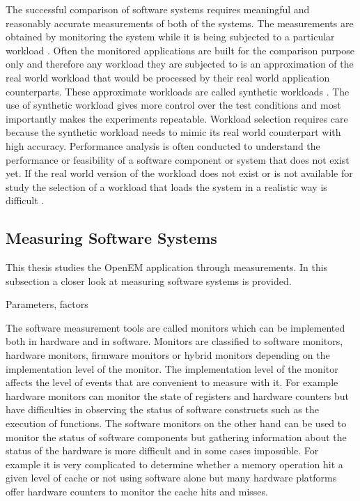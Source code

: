 The successful comparison of software systems requires meaningful and reasonably
accurate measurements of both of the systems. The measurements are obtained by
monitoring the system while it is being subjected to a particular workload
\cite{jain1991art}. Often the monitored applications are built for the
comparison purpose only and therefore any workload they are subjected to is an
approximation of the real world workload that would be processed by their real
world application counterparts. These approximate workloads are called synthetic
workloads \cite{jain1991art}. The use of synthetic workload gives more control
over the test conditions and most importantly makes the experiments repeatable.
Workload selection requires care because the synthetic workload needs to mimic
its real world counterpart with high accuracy. Performance analysis is often
conducted to understand the performance or feasibility of a software component
or system that does not exist yet. If the real world version of the workload
does not exist or is not available for study the selection of a workload that
loads the system in a realistic way is difficult \cite{jain1991art}.

\subsection{Measuring Software Systems}
\label{subsec:measure}
This thesis studies the OpenEM application through measurements. In this
subsection a closer look at measuring software systems is provided.

Parameters, factors

The software measurement tools are called monitors which can be implemented both
in hardware and in software. Monitors are classified to software monitors,
hardware monitors, firmware monitors or hybrid monitors depending on the
implementation level of the monitor. The implementation level of the monitor
affects the level of events that are convenient to measure with it. For example
hardware monitors can monitor the state of registers and hardware counters but
have difficulties in observing the status of software constructs such as the
execution of functions. The software monitors on the other hand can be used to
monitor the status of software components but gathering information about the
status of the hardware is more difficult and in some cases impossible.
\cite{jain1991art} For example it is very complicated to determine whether a
memory operation hit a given level of cache or not using software alone but many
hardware platforms offer hardware counters to monitor the cache hits and misses.

